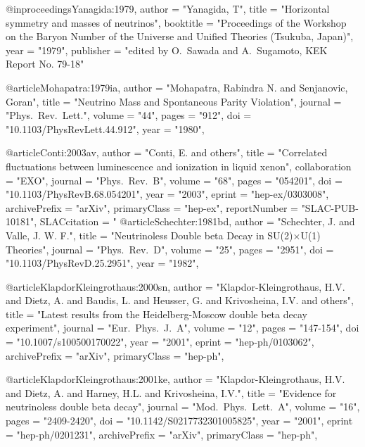 @inproceedings{Yanagida:1979,
      author         = "Yanagida, T",
      title          = "Horizontal symmetry and masses of neutrinos",
      booktitle      = "{Proceedings of the Workshop on the Baryon Number 
                         of the Universe and Unified Theories (Tsukuba, Japan)}",
      year           = "1979",
      publisher      = "edited by O.~Sawada and A.~Sugamoto, KEK Report No. 79-18"
}

@article{Mohapatra:1979ia,
      author         = "Mohapatra, Rabindra N. and Senjanovic, Goran",
      title          = "{Neutrino Mass and Spontaneous Parity Violation}",
      journal        = "Phys.\ Rev.\ Lett.",
      volume         = "44",
      pages          = "912",
      doi            = "10.1103/PhysRevLett.44.912",
      year           = "1980",
}


@article{Conti:2003av,
      author         = "Conti, E. and others",
      title          = "{Correlated fluctuations between luminescence and
                        ionization in liquid xenon}",
      collaboration  = "EXO",
      journal        = "Phys.\ Rev.\ B",
      volume         = "68",
      pages          = "054201",
      doi            = "10.1103/PhysRevB.68.054201",
      year           = "2003",
      eprint         = "hep-ex/0303008",
      archivePrefix  = "arXiv",
      primaryClass   = "hep-ex",
      reportNumber   = "SLAC-PUB-10181",
      SLACcitation   = "%
}
@article{Schechter:1981bd,
      author         = "Schechter, J. and Valle, J. W. F.",
      title          = "{Neutrinoless Double beta Decay in SU(2)$\times$U(1)
                        Theories}",
      journal        = "Phys.\ Rev.\ D",
      volume         = "25",
      pages          = "2951",
      doi            = "10.1103/PhysRevD.25.2951",
      year           = "1982",
}

@article{KlapdorKleingrothaus:2000sn,
      author         = "Klapdor-Kleingrothaus, H.V. and Dietz, A. and Baudis, L.
                        and Heusser, G. and Krivosheina, I.V. and others",
      title          = "{Latest results from the Heidelberg-Moscow double beta
                        decay experiment}",
      journal        = "Eur.\ Phys.\ J.\ A",
      volume         = "12",
      pages          = "147-154",
      doi            = "10.1007/s100500170022",
      year           = "2001",
      eprint         = "hep-ph/0103062",
      archivePrefix  = "arXiv",
      primaryClass   = "hep-ph",
}

@article{KlapdorKleingrothaus:2001ke,
      author         = "Klapdor-Kleingrothaus, H.V. and Dietz, A. and Harney,
                        H.L. and Krivosheina, I.V.",
      title          = "{Evidence for neutrinoless double beta decay}",
      journal        = "Mod.\ Phys.\ Lett.\ A",
      volume         = "16",
      pages          = "2409-2420",
      doi            = "10.1142/S0217732301005825",
      year           = "2001",
      eprint         = "hep-ph/0201231",
      archivePrefix  = "arXiv",
      primaryClass   = "hep-ph",
}

